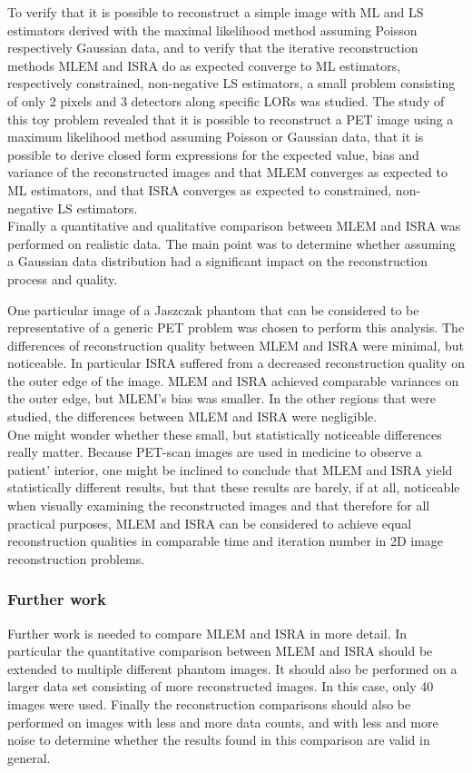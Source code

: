 \documentclass[report,12pt]{report}
\begin{document}
To verify that it is possible to reconstruct a simple image with ML and LS estimators derived with the maximal likelihood method assuming Poisson respectively Gaussian data, and to verify that the iterative reconstruction methods MLEM and ISRA do as expected converge to ML estimators, respectively constrained, non-negative LS estimators, a small problem consisting of only 2 pixels and 3 detectors along specific LORs was studied. The study of this toy problem revealed that it is possible to reconstruct a PET image using a maximum likelihood method assuming Poisson or Gaussian data, that it is possible to derive closed form expressions for the expected value, bias and variance of the reconstructed images and that MLEM converges as expected to ML estimators, and that ISRA converges as expected to constrained, non-negative LS estimators.\\

Finally a quantitative and qualitative comparison between MLEM and ISRA was performed on realistic data. The main point was to determine whether assuming a Gaussian data distribution had a significant impact on the reconstruction process and quality. 

One particular image of a Jaszczak phantom that can be considered to be representative of a generic PET problem was chosen to perform this analysis. The differences of reconstruction quality between MLEM and ISRA were minimal, but noticeable. In particular ISRA suffered from a decreased reconstruction quality on the outer edge of the image. MLEM and ISRA achieved comparable variances on the outer edge, but MLEM's bias was smaller. In the other regions that were studied, the differences between MLEM and ISRA were negligible.\\

One might wonder whether these small, but statistically noticeable differences really matter. Because PET-scan images are used in medicine to observe a patient' interior, one might be inclined to conclude that MLEM and ISRA  yield statistically different results, but that these results are barely, if at all, noticeable when visually examining the reconstructed images and that therefore for all practical purposes, MLEM and ISRA can be considered to achieve equal reconstruction qualities in comparable time and iteration number in 2D image reconstruction problems.




\subsubsection*{Further work}
Further work is needed to compare MLEM and ISRA in more detail. In particular the quantitative comparison between MLEM and ISRA should be extended to multiple different phantom images. It should also be performed on a larger data set consisting of more reconstructed images. In this case, only 40 images were used. Finally the reconstruction comparisons should also be performed on images with less and more data counts, and with less and more noise to determine whether the results found in this comparison are valid in general.
\end{document}
